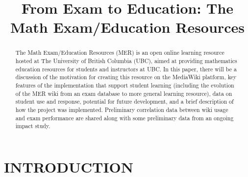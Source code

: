 \documentclass{primus}
\title{From Exam to Education: The Math Exam/Education Resources}
\begin{document}
\makePtitle

\begin{abstract}
The Math Exam/Education Resources (MER) is an open online learning resource hosted at The University of British Columbia (UBC), aimed at providing mathematics education resources for students and instructors at UBC. In this paper, there will be a discussion of the motivation for creating this resource on the MediaWiki platform, key features of the implementation that support student learning (including the evolution of the MER wiki from an exam database to more general learning resource), data on student use and response, potential for future development, and a brief description of how the project was implemented. Preliminary correlation data between wiki usage and exam performance are shared along with some preliminary data from an ongoing impact study.
\end{abstract}

\listkeywords

\section{INTRODUCTION}\label{sec:Introduction}
\end{document}

